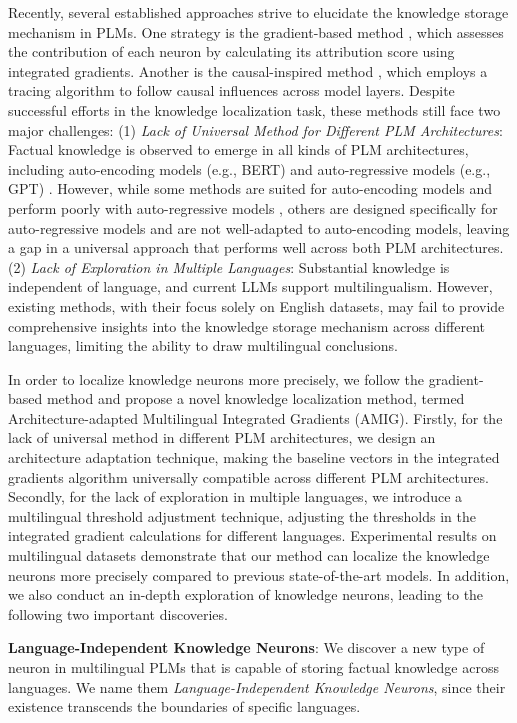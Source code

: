 \documentclass[]{article}
\begin{document}
Recently, several established approaches strive to elucidate the knowledge storage mechanism in PLMs. 
One strategy is the gradient-based method \cite{ancona2019gradient}, which assesses the contribution of each neuron by calculating its attribution score using integrated gradients. Another is the causal-inspired method \cite{cao2023life}, which employs a tracing algorithm to follow causal influences across model layers. Despite successful efforts in the knowledge localization task, these methods still face two major challenges: 
(1) \textit{Lack of Universal Method for Different PLM Architectures}:
Factual knowledge is observed to emerge in all kinds of PLM architectures, including auto-encoding models (e.g., BERT) \cite{mbert} and auto-regressive models (e.g., GPT) \cite{mgpt}. However, while some methods are suited for auto-encoding models and perform poorly with auto-regressive models \cite{meng2022locating}, others are designed specifically for auto-regressive models and are not well-adapted to auto-encoding models\cite{causal-inspired}, leaving a gap in a universal approach that performs well across both PLM architectures.
(2) \textit{Lack of Exploration in Multiple Languages}:
Substantial knowledge is independent of language, and current LLMs support multilingualism. However, existing methods, with their focus solely on English datasets, may fail to provide comprehensive insights into the knowledge storage mechanism across different languages, limiting the ability to draw multilingual conclusions.

In order to localize knowledge neurons more precisely, we follow the gradient-based method and propose a novel knowledge localization method, termed Architecture-adapted Multilingual Integrated Gradients (AMIG).
Firstly, for the lack of universal method in different PLM architectures, we design an architecture adaptation technique, making the baseline vectors in the integrated gradients algorithm \cite{rigorousIG} universally compatible across different PLM architectures. Secondly, for the lack of exploration in multiple languages, we introduce a multilingual threshold adjustment technique, adjusting the thresholds in the integrated gradient calculations for different languages. Experimental results on multilingual datasets demonstrate that our method can localize the knowledge neurons more precisely compared to previous state-of-the-art models. In addition, we also conduct an in-depth exploration of knowledge neurons, leading to the following two important discoveries.

\textbf{Language-Independent Knowledge Neurons}: We discover a new type of neuron in multilingual PLMs that is capable of storing factual knowledge across languages.
We name them \textit{Language-Independent Knowledge Neurons}, since their existence transcends the boundaries of specific languages.
\end{document}
